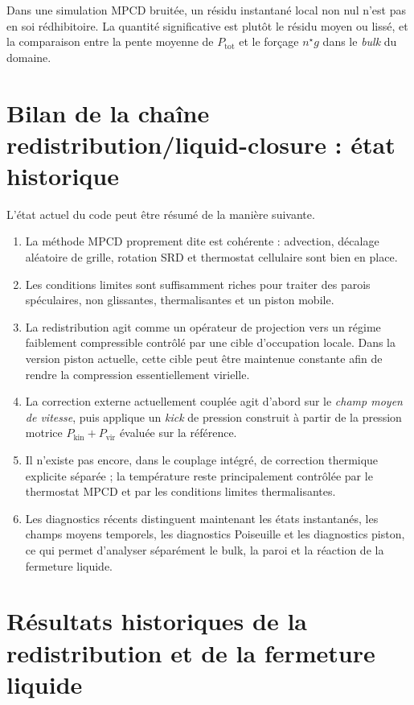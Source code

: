 \documentclass[11pt,a4paper]{article}
\begin{document}
Dans une simulation MPCD bruitée, un résidu instantané local non nul n'est pas en soi rédhibitoire. La quantité significative est plutôt le résidu moyen ou lissé, et la comparaison entre la pente moyenne de $P_{\mathrm{tot}}$ et le forçage $n^{\star}g$ dans le \emph{bulk} du domaine.

\section{Bilan de la chaîne redistribution/liquid-closure : état historique}

L'état actuel du code peut être résumé de la manière suivante.

\begin{enumerate}[label=\arabic*)]
  \item La méthode MPCD proprement dite est cohérente : advection, décalage aléatoire de grille, rotation SRD et thermostat cellulaire sont bien en place.
  \item Les conditions limites sont suffisamment riches pour traiter des parois spéculaires, non glissantes, thermalisantes et un piston mobile.
  \item La redistribution agit comme un opérateur de projection vers un régime faiblement compressible contrôlé par une cible d'occupation locale. Dans la version piston actuelle, cette cible peut être maintenue constante afin de rendre la compression essentiellement virielle.
  \item La correction externe actuellement couplée agit d'abord sur le \emph{champ moyen de vitesse}, puis applique un \emph{kick} de pression construit à partir de la pression motrice \(P_{\mathrm{kin}}+P_{\mathrm{vir}}\) évaluée sur la référence.
  \item Il n'existe pas encore, dans le couplage intégré, de correction thermique explicite séparée ; la température reste principalement contrôlée par le thermostat MPCD et par les conditions limites thermalisantes.
  \item Les diagnostics récents distinguent maintenant les états instantanés, les champs moyens temporels, les diagnostics Poiseuille et les diagnostics piston, ce qui permet d'analyser séparément le bulk, la paroi et la réaction de la fermeture liquide.
\end{enumerate}

\section{Résultats historiques de la redistribution et de la fermeture liquide}
\end{document}
